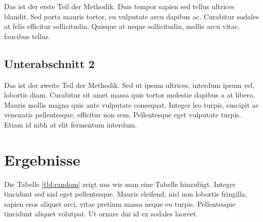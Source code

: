 \documentclass[listof=totoc,index=totoc,bibliography=totoc,12pt,ngerman,a4paper,]{report}
\begin{document}
Das ist der erste Teil der Methodik. Duis tempor sapien sed tellus
ultrices blandit. Sed porta mauris tortor, eu vulputate arcu dapibus ac.
Curabitur sodales at felis efficitur sollicitudin. Quisque at neque
sollicitudin, mollis arcu vitae, faucibus tellus.

\subsection{Unterabschnitt 2}\label{unterabschnitt-2-2}

Das ist der zweite Teil der Methodik. Sed ut ipsum ultrices, interdum
ipsum vel, lobortis diam. Curabitur sit amet massa quis tortor molestie
dapibus a at libero. Mauris mollis magna quis ante vulputate consequat.
Integer leo turpis, suscipit ac venenatis pellentesque, efficitur non
sem. Pellentesque eget vulputate turpis. Etiam id nibh at elit fermentum
interdum.

\section{Ergebnisse}\label{ergebnisse-2}

Die Tabelle \ref{tbl:random} zeigt uns wie man eine Tabelle hinzufügt.
Integer tincidunt sed nisl eget pellentesque. Mauris eleifend, nisl non
lobortis fringilla, sapien eros aliquet orci, vitae pretium massa neque
eu turpis. Pellentesque tincidunt aliquet volutpat. Ut ornare dui id ex
sodales laoreet.

\newpage

\def\pandoctableshortcapt{Table short caption}
\end{document}
